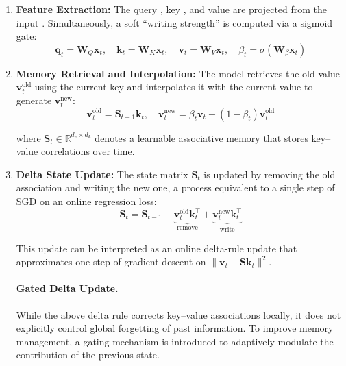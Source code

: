 \begin{enumerate}
\item \textbf{Feature Extraction:} The query , key , and value  are projected from the input . Simultaneously, a soft ``writing strength''  is computed via a sigmoid gate:
\begin{equation}
\mathbf{q}_t = \mathbf{W}_Q \mathbf{x}_t, \quad \mathbf{k}_t = \mathbf{W}_K \mathbf{x}_t, \quad \mathbf{v}_t = \mathbf{W}_V \mathbf{x}_t, \quad \beta_t = \sigma(\mathbf{W}_\beta \mathbf{x}_t)
\end{equation}

\item \textbf{Memory Retrieval and Interpolation:} The model retrieves the old value $\mathbf{v}_t^{\text{old}}$ using the current key and interpolates it with the current value to generate $\mathbf{v}_t^{\text{new}}$:
\begin{equation}
    \mathbf{v}_t^{\text{old}} = \mathbf{S}_{t-1} \mathbf{k}_t, \quad \mathbf{v}_t^{\text{new}} = \beta_t \mathbf{v}_t + (1 - \beta_t) \mathbf{v}_t^{\text{old}}
\end{equation}

where $\mathbf{S}_t \in \mathbb{R}^{d_v \times d_k}$ denotes a learnable associative memory that stores key–value correlations over time.

\item \textbf{Delta State Update:} The state matrix $\mathbf{S}_t$ is updated by removing the old association and writing the new one, a process equivalent to a single step of SGD on an online regression loss:
\begin{equation}
    \mathbf{S}_t = \mathbf{S}_{t-1} - \underbrace{\mathbf{v}_t^{\text{old}} \mathbf{k}_t^\top}_{\text{remove}} + \underbrace{\mathbf{v}_t^{\text{new}} \mathbf{k}_t^\top}_{\text{write}}
\end{equation}

This update can be interpreted as an online delta-rule update that approximates one step of gradient descent on $\|\mathbf{v}_t - \mathbf{S}\mathbf{k}_t\|^2$.

\paragraph{Gated Delta Update.}
While the above delta rule corrects key–value associations locally, it does not explicitly control global forgetting of past information. To improve memory management, a gating mechanism is introduced to adaptively modulate the contribution of the previous state.


\end{enumerate}
